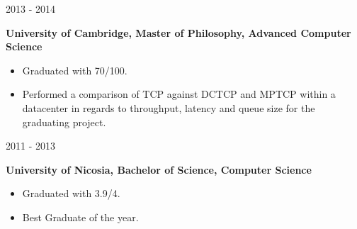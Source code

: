 %
%
%

	\begin{scholarship}
		\keywordsentry
			{2013 - 2014}
			{
				\textbf{University of Cambridge, Master of Philosophy, Advanced Computer Science}
				\begin{itemize}
					\item Graduated with 70/100.
					\item Performed a comparison of TCP against DCTCP and MPTCP within a datacenter in regards to throughput, latency and queue size for the graduating project.
				\end{itemize}
			}
		\keywordsentry
			{2011 - 2013}
			{
				\textbf{University of Nicosia, Bachelor of Science, Computer Science}
				\begin{itemize}
					\item Graduated with 3.9/4.
					\item Best Graduate of the year.
				\end{itemize}
			}
	\end{scholarship}
